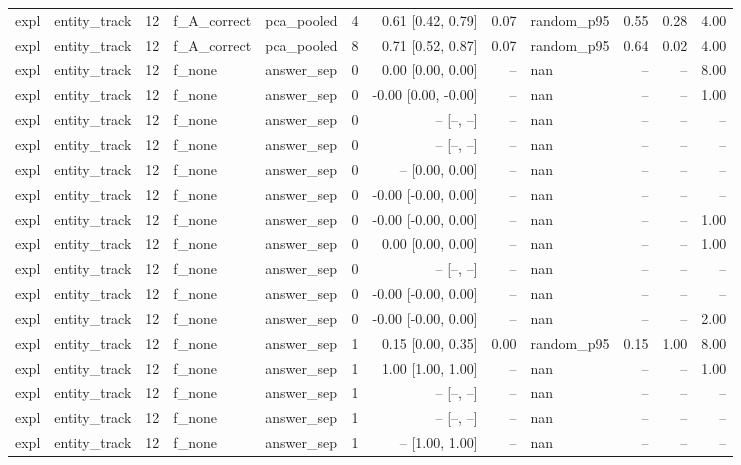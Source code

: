 \begin{tabular}{llrllrrrlrrr}
expl & entity\_track & 12 & f\_A\_correct & pca\_pooled & 4 & 0.61 [0.42, 0.79] & 0.07 & random\_p95 & 0.55 & 0.28 & 4.00 \\
expl & entity\_track & 12 & f\_A\_correct & pca\_pooled & 8 & 0.71 [0.52, 0.87] & 0.07 & random\_p95 & 0.64 & 0.02 & 4.00 \\
expl & entity\_track & 12 & f\_none & answer\_sep & 0 & 0.00 [0.00, 0.00] & -- & nan & -- & -- & 8.00 \\
expl & entity\_track & 12 & f\_none & answer\_sep & 0 & -0.00 [0.00, -0.00] & -- & nan & -- & -- & 1.00 \\
expl & entity\_track & 12 & f\_none & answer\_sep & 0 & -- [--, --] & -- & nan & -- & -- & -- \\
expl & entity\_track & 12 & f\_none & answer\_sep & 0 & -- [--, --] & -- & nan & -- & -- & -- \\
expl & entity\_track & 12 & f\_none & answer\_sep & 0 & -- [0.00, 0.00] & -- & nan & -- & -- & -- \\
expl & entity\_track & 12 & f\_none & answer\_sep & 0 & -0.00 [-0.00, 0.00] & -- & nan & -- & -- & -- \\
expl & entity\_track & 12 & f\_none & answer\_sep & 0 & -0.00 [-0.00, 0.00] & -- & nan & -- & -- & 1.00 \\
expl & entity\_track & 12 & f\_none & answer\_sep & 0 & 0.00 [0.00, 0.00] & -- & nan & -- & -- & 1.00 \\
expl & entity\_track & 12 & f\_none & answer\_sep & 0 & -- [--, --] & -- & nan & -- & -- & -- \\
expl & entity\_track & 12 & f\_none & answer\_sep & 0 & -0.00 [-0.00, 0.00] & -- & nan & -- & -- & -- \\
expl & entity\_track & 12 & f\_none & answer\_sep & 0 & -0.00 [-0.00, 0.00] & -- & nan & -- & -- & 2.00 \\
expl & entity\_track & 12 & f\_none & answer\_sep & 1 & 0.15 [0.00, 0.35] & 0.00 & random\_p95 & 0.15 & 1.00 & 8.00 \\
expl & entity\_track & 12 & f\_none & answer\_sep & 1 & 1.00 [1.00, 1.00] & -- & nan & -- & -- & 1.00 \\
expl & entity\_track & 12 & f\_none & answer\_sep & 1 & -- [--, --] & -- & nan & -- & -- & -- \\
expl & entity\_track & 12 & f\_none & answer\_sep & 1 & -- [--, --] & -- & nan & -- & -- & -- \\
expl & entity\_track & 12 & f\_none & answer\_sep & 1 & -- [1.00, 1.00] & -- & nan & -- & -- & -- \\

\end{tabular}
